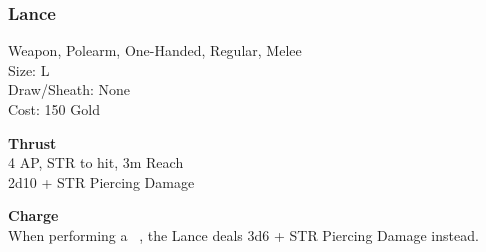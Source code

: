 \subsubsection{Lance}\label{weapon:lance}
Weapon, Polearm, One-Handed, Regular, Melee\\
Size: L\\
Draw/Sheath: None\\
Cost: 150 Gold

\textbf{Thrust}\\
4 AP, STR to hit, 3m Reach\\
2d10 + \texttimes STR Piercing Damage

\textbf{Charge}\\
When performing a ~, the Lance deals 3d6 + \texttimes STR Piercing Damage instead.